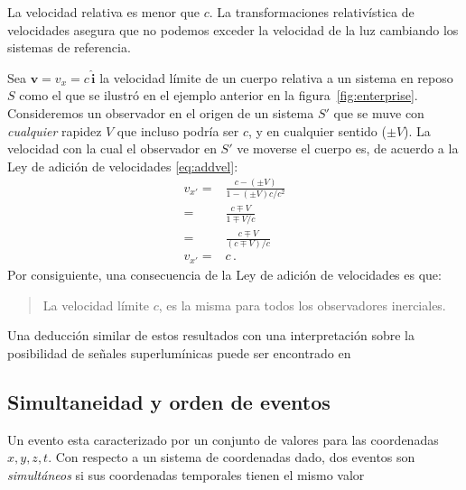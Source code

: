 \begin{frame}
\begin{itemize}
La velocidad relativa es menor que $c$. La transformaciones relativística de velocidades asegura que no podemos exceder la velocidad de la luz cambiando los sistemas de referencia. 
\end{itemize}

Sea $\mathbf{v}=v_{x}=c\,\hat{\mathbf{i}}$ la velocidad límite de un cuerpo relativa a un sistema en reposo $S$ como el que se ilustró en el ejemplo anterior en la figura~\ref{fig:enterprise}. Consideremos un observador en el origen de un sistema $S'$ que se muve con \emph{cualquier} rapidez $V$ que incluso podría ser $c$, y en cualquier sentido ($\pm V$). La velocidad con la cual el observador en $S'$ ve moverse el cuerpo es, de acuerdo a  la Ley de adición de velocidades \eqref{eq:addvel}:
\begin{align*}
  v_{x'}=&\frac{c-(\pm V)}{1-(\pm V)c/c^2}\nonumber\\
  =&\frac{c\mp V}{1\mp V/c}\nonumber\\
  =&\frac{c\mp V}{(c\mp V)/c}\nonumber\\
  v_{x'}=&c\,.
\end{align*}
Por consiguiente, una consecuencia de la Ley de adición de velocidades es que:
\begin{quote}
  La velocidad límite $c$, es la misma para todos los observadores inerciales.
\end{quote}

\end{frame}
Una deducción similar de estos resultados con una interpretación sobre la posibilidad de señales superlumínicas puede ser encontrado en~\cite{Liberati:2001sd,Pelissetto:2015bva}

\subsection{Simultaneidad y orden de eventos}

\begin{frame}
Un evento esta caracterizado por un conjunto de valores para las coordenadas $x,y,z,t$.  Con respecto a un sistema de coordenadas dado, dos eventos son \emph{simultáneos} si sus coordenadas temporales tienen el mismo valor
\end{frame}

